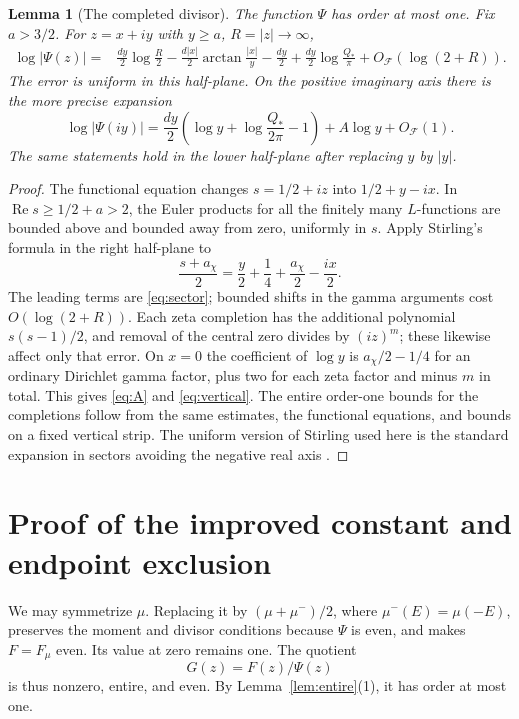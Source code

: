 \documentclass[11pt]{article}
\newtheorem{lemma}[theorem]{Lemma}
\theoremstyle{remark}\newtheorem{remark}[theorem]{Remark}
\newcommand{\Rea}{\operatorname{Re}}\newcommand{\Ima}{\operatorname{Im}}
\begin{document}
\begin{lemma}[The completed divisor]\label{lem:stirling}
The function $\Psi$ has order at most one. Fix $a>3/2$. For $z=x+iy$ with $y\ge a$, $R=|z|\to\infty$,
\begin{align}\label{eq:sector}
 \log|\Psi(z)|={}&\frac{dy}{2}\log\frac R2
 -\frac{d|x|}{2}\arctan\frac{|x|}{y}-\frac{dy}{2}
 +\frac{dy}{2}\log\frac{Q_*}{\pi}+O_{\mathcal F}(\log(2+R)).
\end{align}
The error is uniform in this half-plane. On the positive imaginary axis there is the more precise expansion
\begin{equation}\label{eq:vertical}
 \log|\Psi(iy)|=\frac{dy}{2}\left(\log y+\log\frac{Q_*}{2\pi}-1\right)
 +A\log y+O_{\mathcal F}(1).
\end{equation}
The same statements hold in the lower half-plane after replacing $y$ by $|y|$.
\end{lemma}
\begin{proof}
The functional equation changes $s=1/2+iz$ into $1/2+y-ix$. In $\Rea s\ge1/2+a>2$, the Euler products for all the finitely many $L$-functions are bounded above and bounded away from zero, uniformly in $s$. Apply Stirling's formula in the right half-plane to
\[
 \frac{s+a_\chi}{2}=\frac y2+\frac14+\frac{a_\chi}{2}-\frac{ix}{2}.
\]
The leading terms are \eqref{eq:sector}; bounded shifts in the gamma arguments cost $O(\log(2+R))$. Each zeta completion has the additional polynomial $s(s-1)/2$, and removal of the central zero divides by $(iz)^m$; these likewise affect only that error. On $x=0$ the coefficient of $\log y$ is $a_\chi/2-1/4$ for an ordinary Dirichlet gamma factor, plus two for each zeta factor and minus $m$ in total. This gives \eqref{eq:A} and \eqref{eq:vertical}. The entire order-one bounds for the completions follow from the same estimates, the functional equations, and bounds on a fixed vertical strip. The uniform version of Stirling used here is the standard expansion in sectors avoiding the negative real axis \cite[\S5.11]{DLMF}.
\end{proof}

\section{Proof of the improved constant and endpoint exclusion}

We may symmetrize $\mu$. Replacing it by $(\mu+\mu^{-})/2$, where $\mu^{-}(E)=\mu(-E)$, preserves the moment and divisor conditions because $\Psi$ is even, and makes $F=F_\mu$ even. Its value at zero remains one. The quotient
\[
 G(z)=F(z)/\Psi(z)
\]
is thus nonzero, entire, and even. By Lemma~\ref{lem:entire}(1), it has order at most one.
\end{document}
